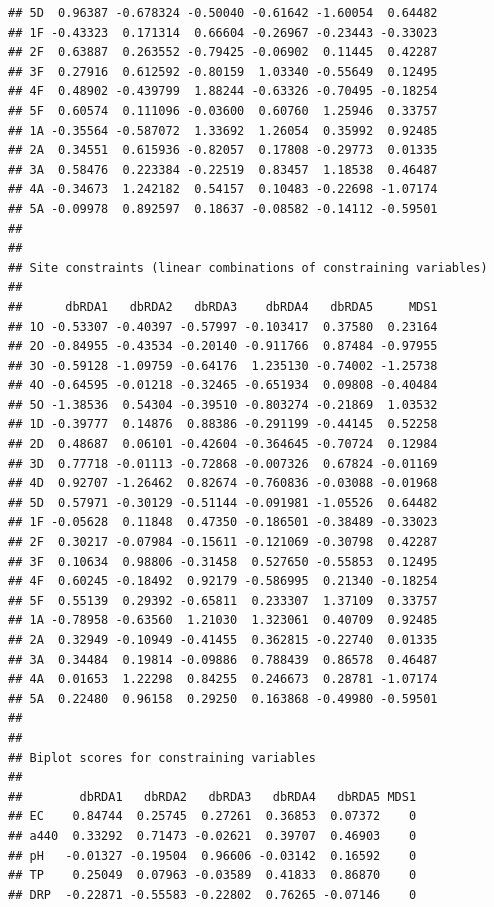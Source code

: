 \documentclass[
]{book}
\begin{document}
\begin{verbatim}
## 5D  0.96387 -0.678324 -0.50040 -0.61642 -1.60054  0.64482
## 1F -0.43323  0.171314  0.66604 -0.26967 -0.23443 -0.33023
## 2F  0.63887  0.263552 -0.79425 -0.06902  0.11445  0.42287
## 3F  0.27916  0.612592 -0.80159  1.03340 -0.55649  0.12495
## 4F  0.48902 -0.439799  1.88244 -0.63326 -0.70495 -0.18254
## 5F  0.60574  0.111096 -0.03600  0.60760  1.25946  0.33757
## 1A -0.35564 -0.587072  1.33692  1.26054  0.35992  0.92485
## 2A  0.34551  0.615936 -0.82057  0.17808 -0.29773  0.01335
## 3A  0.58476  0.223384 -0.22519  0.83457  1.18538  0.46487
## 4A -0.34673  1.242182  0.54157  0.10483 -0.22698 -1.07174
## 5A -0.09978  0.892597  0.18637 -0.08582 -0.14112 -0.59501
## 
## 
## Site constraints (linear combinations of constraining variables)
## 
##      dbRDA1   dbRDA2   dbRDA3    dbRDA4   dbRDA5     MDS1
## 1O -0.53307 -0.40397 -0.57997 -0.103417  0.37580  0.23164
## 2O -0.84955 -0.43534 -0.20140 -0.911766  0.87484 -0.97955
## 3O -0.59128 -1.09759 -0.64176  1.235130 -0.74002 -1.25738
## 4O -0.64595 -0.01218 -0.32465 -0.651934  0.09808 -0.40484
## 5O -1.38536  0.54304 -0.39510 -0.803274 -0.21869  1.03532
## 1D -0.39777  0.14876  0.88386 -0.291199 -0.44145  0.52258
## 2D  0.48687  0.06101 -0.42604 -0.364645 -0.70724  0.12984
## 3D  0.77718 -0.01113 -0.72868 -0.007326  0.67824 -0.01169
## 4D  0.92707 -1.26462  0.82674 -0.760836 -0.03088 -0.01968
## 5D  0.57971 -0.30129 -0.51144 -0.091981 -1.05526  0.64482
## 1F -0.05628  0.11848  0.47350 -0.186501 -0.38489 -0.33023
## 2F  0.30217 -0.07984 -0.15611 -0.121069 -0.30798  0.42287
## 3F  0.10634  0.98806 -0.31458  0.527650 -0.55853  0.12495
## 4F  0.60245 -0.18492  0.92179 -0.586995  0.21340 -0.18254
## 5F  0.55139  0.29392 -0.65811  0.233307  1.37109  0.33757
## 1A -0.78958 -0.63560  1.21030  1.323061  0.40709  0.92485
## 2A  0.32949 -0.10949 -0.41455  0.362815 -0.22740  0.01335
## 3A  0.34484  0.19814 -0.09886  0.788439  0.86578  0.46487
## 4A  0.01653  1.22298  0.84255  0.246673  0.28781 -1.07174
## 5A  0.22480  0.96158  0.29250  0.163868 -0.49980 -0.59501
## 
## 
## Biplot scores for constraining variables
## 
##        dbRDA1   dbRDA2   dbRDA3   dbRDA4   dbRDA5 MDS1
## EC    0.84744  0.25745  0.27261  0.36853  0.07372    0
## a440  0.33292  0.71473 -0.02621  0.39707  0.46903    0
## pH   -0.01327 -0.19504  0.96606 -0.03142  0.16592    0
## TP    0.25049  0.07963 -0.03589  0.41833  0.86870    0
## DRP  -0.22871 -0.55583 -0.22802  0.76265 -0.07146    0
\end{verbatim}
\end{document}
